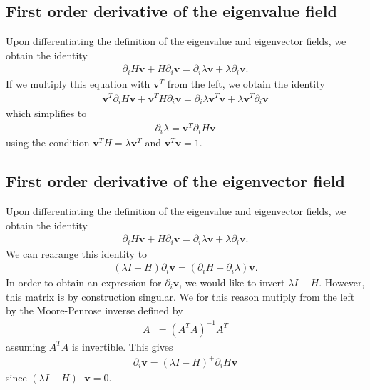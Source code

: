 \documentclass{article}
\begin{document}
\subsection{First order derivative of the eigenvalue field}
Upon differentiating the definition of the eigenvalue and eigenvector fields, we obtain the identity 
\begin{align}
\partial_i H \bm{v} + H \partial_i \bm{v} = \partial_i \lambda \bm{v} + \lambda \partial_i \bm{v}.
\end{align}
If we multiply this equation with $\bm{v}^T$ from the left, we obtain the identity
\begin{align}
\bm{v}^T\partial_i H \bm{v} + \bm{v}^TH \partial_i \bm{v} = \partial_i \lambda \bm{v}^T\bm{v} + \lambda \bm{v}^T \partial_i \bm{v}
\end{align}
which simplifies to
\begin{align}
\partial_i \lambda = \bm{v}^T\partial_i H \bm{v} 
\end{align}
using the condition $\bm{v}^T H = \lambda \bm{v}^T$ and $\bm{v}^T\bm{v}=1$.


\subsection{First order derivative of the eigenvector field}
Upon differentiating the definition of the eigenvalue and eigenvector fields, we obtain the identity 
\begin{align}
\partial_i H \bm{v} + H \partial_i \bm{v} = \partial_i \lambda \bm{v} + \lambda \partial_i \bm{v}.
\end{align}
We can rearange this identity to 
\begin{align}
(\lambda I - H) \partial_i \bm{v} = (\partial_i H - \partial_i \lambda )\bm{v}.
\end{align}
In order to obtain an expression for $\partial_i \bm{v}$, we would like to invert $\lambda I - H$. However, this matrix is by construction singular. We for this reason mutiply from the left by the Moore-Penrose inverse defined by
\begin{align}
A^+ = (A^T A)^{-1}A^T
\end{align}
assuming $A^T A$ is invertible. This gives
\begin{align}
\partial_i \bm{v} = (\lambda I - H)^+ \partial_i H \bm{v}
\end{align}
since $(\lambda I - H)^+ \bm{v}=0$.
\end{document}

